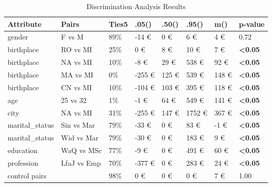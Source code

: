 \begin{table}
\caption{Discrimination Analysis Results}
\label{table:discrimination_analysis}
\begin{tabular}{llllllll}
\toprule
Attribute & Pairs & Ties5 & .05() & .50() & .95() & m() & p-value \\
\midrule
gender & F vs M & 89\% & -14 € & 0 € & 6 € & 4 € & 0.72 \\
birthplace & RO vs MI & 25\% & 0 € & 8 € & 10 € & 7 € & \textbf{<0.05} \\
birthplace & NA vs MI & 10\% & -8 € & 29 € & 538 € & 92 € & \textbf{<0.05} \\
birthplace & MA vs MI & 0\% & -255 € & 125 € & 539 € & 148 € & \textbf{<0.05} \\
birthplace & CN vs MI & 10\% & -104 € & 103 € & 395 € & 118 € & \textbf{<0.05} \\
age & 25 vs 32 & 1\% & -1 € & 64 € & 549 € & 141 € & \textbf{<0.05} \\
city & NA vs MI & 31\% & -255 € & 147 € & 1752 € & 367 € & \textbf{<0.05} \\
marital_status & Sin vs Mar & 79\% & -33 € & 0 € & 83 € & -1 € & \textbf{<0.05} \\
marital_status & Wid vs Mar & 79\% & -30 € & 0 € & 183 € & 9 € & \textbf{<0.05} \\
education & WaQ vs MSc & 77\% & -9 € & 0 € & 491 € & 60 € & \textbf{<0.05} \\
profession & LfaJ vs Emp & 70\% & -377 € & 0 € & 283 € & 24 € & \textbf{<0.05} \\
control pairs &  & 98\% & 0 € & 0 € & 0 € & 7 € & 1.00 \\
\bottomrule
\end{tabular}
\end{table}
